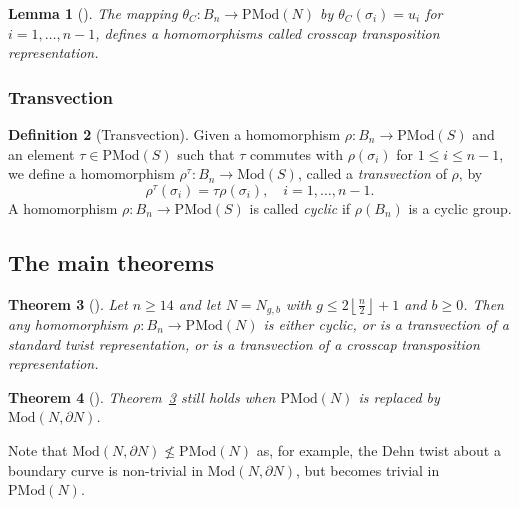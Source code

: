 \documentclass[reqno]{amsart}
\newtheorem{theorem}{Theorem}[section]
\newtheorem{lemma}[theorem]{Lemma}
\theoremstyle{definition}
\newtheorem{definition}[theorem]{Definition}
\theoremstyle{remark}
\newcommand{\Mod}{{\mathrm{Mod}}}
\newcommand{\PMod}{{\mathrm{PMod}}}
\begin{document}
\begin{lemma}[]
    The mapping $\theta_{C} \colon B_n \to \PMod (N)$ by
    $\theta_C \left( \sigma_i \right) =u_i$ for
    $i = 1,\ldots, n-1$, defines a homomorphisms
    called crosscap transposition representation.
\end{lemma}


\subsubsection{Transvection}

\begin{definition}[Transvection]
    Given a homomorphism
    $\rho \colon B_n \to \PMod (S)$ and an element
    $\tau \in \PMod (S)$ such that
    $\tau$ commutes with $\rho\left( \sigma_i \right) $ 
    for $1 \le i \le n-1$, we define a homomorphism
    $\rho^{\tau} \colon B_n \to \Mod (S)$, called
    a \textit{transvection} of $\rho$, by
    \[
        \rho^{\tau} \left( \sigma_i \right) 
        = \tau \rho \left( \sigma_i \right) , \quad
        i = 1,\ldots, n-1.
    \] 
    A homomorphism $\rho \colon B_n \to \PMod (S)$ is called
    \textit{cyclic} if $\rho \left( B_n \right) $ is a 
    cyclic group. 
\end{definition}

\subsection{The main theorems}

\begin{theorem}[]\label{Thm1.2}
    Let $n \ge 14$ and let $N = N_{g,b}$ with
    $g \le 2 \left\lfloor \frac{n}{2} \right\rfloor +1$ and
    $b\ge 0$. Then any homomorphism
    $\rho \colon B_n \to \PMod (N)$ is either
    cyclic, or is a transvection of a standard twist
    representation, or is a transvection of a crosscap
    transposition representation.
\end{theorem}

\begin{theorem}[]\label{Thm1.3}
    Theorem~\ref{Thm1.2} still holds
    when $\PMod (N)$ is replaced by $\Mod \left( N,
    \partial N \right) $.
\end{theorem}

Note that $\Mod (N, \partial N) \not \le 
\PMod (N)$ as, for example, the Dehn twist about a boundary
curve is non-trivial in $\Mod \left( N, \partial N \right) $, but
becomes trivial in $\PMod (N)$.
\end{document}
